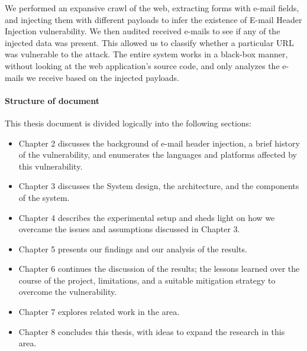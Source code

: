 	We performed an expansive crawl of the web, extracting forms with e-mail fields, and injecting them with different payloads to infer the existence of E-mail Header Injection vulnerability. We then audited received e-mails to see if any of the injected data was present. This allowed us to classify whether a particular URL was vulnerable to the attack. The entire system works in a black-box manner, without looking at the web application's source code, and only analyzes the e-mails we receive based on the injected payloads.

\paragraph{Structure of document} %
This thesis document is divided logically into the following sections:
\begin{itemize}
	\item Chapter 2 discusses the background of e-mail header injection, a brief history of the vulnerability, and enumerates the languages and platforms affected by this vulnerability.
	
	\item Chapter 3 discusses the System design, the architecture, and the components of the system.
	
	\item Chapter 4 describes the experimental setup and sheds light on how we overcame the issues and assumptions discussed in Chapter 3.
	
	\item Chapter 5 presents our findings and our analysis of the results.
	
	\item Chapter 6 continues the discussion of the results; the lessons learned over the course of the project, limitations, and a suitable mitigation strategy to overcome the vulnerability.
	
	\item Chapter 7 explores related work in the area.
	
	\item Chapter 8 concludes this thesis, with ideas to expand the research in this area.
\end{itemize} 

